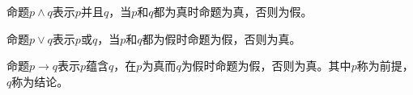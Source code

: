 命题$ p \wedge q $表示$ p $并且$ q $，当$ p $和$ q $都为真时命题为真，否则为假。

\begin{table}[H]
    \centering
    \caption{AND真值表}
\end{table}

命题$ p \vee q $表示$ p $或$ q $，当$ p $和$ q $都为假时命题为假，否则为真。

\begin{table}[H]
    \centering
    \caption{OR真值表}
\end{table}

命题$ p \rightarrow q $表示$ p $蕴含$ q $，在$ p $为真而$ q $为假时命题为假，否则为真。其中$ p $称为前提，$ q $称为结论。

